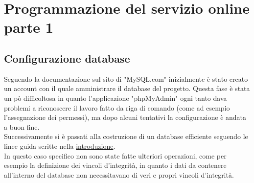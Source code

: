 \chapter{Programmazione del servizio online parte 1}\label{cap:Programmazione del servizio online parte1}

\section{Configurazione database}\label{sez:Configurazione database}

Seguendo la documentazione sul sito di "MySQL.com" inizialmente è stato creato un account con il quale amministrare il database del progetto. Questa fase è stata un pò difficoltosa in quanto l'applicazione "phpMyAdmin" ogni tanto dava  problemi a riconoscere il lavoro fatto da riga di comando (come ad esempio l'assegnazione dei permessi), ma dopo alcuni tentativi la configurazione è andata a buon fine.\\
Successivamente si è passati alla costruzione di un database efficiente seguendo le linee guida scritte nella \hyperref[cap:Introduzione]{introduzione}.\\
In questo caso specifico non sono state fatte ulteriori operazioni, come per esempio la definizione dei vincoli d'integrità, in quanto i dati da contenere all'interno del database non necessitavano di veri e propri vincoli d'integrità.\\

